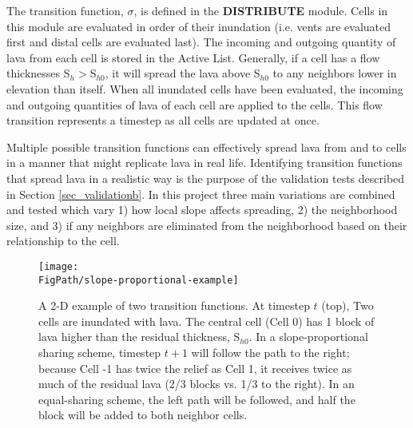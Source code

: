 		The transition function, $\sigma$, is defined in the \textbf{DISTRIBUTE} module. Cells in this module are evaluated in order of their inundation (i.e. vents are evaluated first and distal cells are evaluated last). The incoming and outgoing quantity of lava from each cell is stored in the Active List. Generally, if a cell has a flow thicknesses S$_h>$S$_{h0}$, it will spread the lava above S$_{h0}$ to any neighbors lower in elevation than itself. When all inundated cells have been evaluated, the incoming and outgoing quantities of lava of each cell are applied to the cells. This flow transition represents a timestep as all cells are updated at once.
		
		Multiple possible transition functions can effectively spread lava from and to cells in a manner that might replicate lava in real life. Identifying transition functions that spread lava in a realistic way is the purpose of the validation tests described in Section \ref{sec_validationb}. In this project three main variations are combined and tested which vary 1) how local slope affects spreading, 2) the neighborhood size, and 3) if any neighbors are eliminated from the neighborhood based on their relationship to the cell.
		
		\begin{figure}[!h]
			\centering
			\texttt{[image: \\FigPath/slope-proportional-example]}
			\caption[A 2-D example of two transition functions with different slope treatments]{A 2-D example of two transition functions. At timestep $t$ (top), Two cells are inundated with lava. The central cell (Cell 0) has 1 block of lava higher than the residual thickness, S$_{h0}$. In a slope-proportional sharing scheme, timestep $t+1$ will follow the path to the right; because Cell -1 has twice the relief as Cell 1, it receives twice as much of the residual lava (2/3 blocks vs. 1/3 to the right). In an equal-sharing scheme, the left path will be followed, and half the block will be added to both neighbor cells.}
			\label{fig_BernieSanders}
		\end{figure}
		
